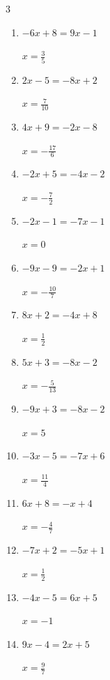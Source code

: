 \begin{multicols}{3}
\begin{enumerate}
  \item $-6x+8=9x-1$

        $\displaystyle x=\frac{3}{5}$

  \item $2x-5=-8x+2$

        $\displaystyle x=\frac{7}{10}$

  \item $4x+9=-2x-8$

        $\displaystyle x=-\frac{17}{6}$

  \item $-2x+5=-4x-2$

        $\displaystyle x=-\frac{7}{2}$

  \item $-2x-1=-7x-1$

        $\displaystyle x=0$

  \item $-9x-9=-2x+1$

        $\displaystyle x=-\frac{10}{7}$

\columnbreak %

\resetques

  \item $8x+2=-4x+8$

        $\displaystyle x=\frac{1}{2}$

  \item $5x+3=-8x-2$

        $\displaystyle x=-\frac{5}{13}$

  \item $-9x+3=-8x-2$

        $\displaystyle x=5$

  \item $-3x-5=-7x+6$

        $\displaystyle x=\frac{11}{4}$

  \item $6x+8=-x+4$

        $\displaystyle x=-\frac{4}{7}$

  \item $-7x+2=-5x+1$

        $\displaystyle x=\frac{1}{2}$

  \item $-4x-5=6x+5$

        $\displaystyle x=-1$

  \item $9x-4=2x+5$

        $\displaystyle x=\frac{9}{7}$


\end{enumerate}
\end{multicols}
